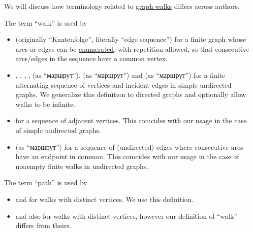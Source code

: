 \begin{remark}\label{rem:graph_walk_terminology}
  We will discuss how terminology related to \hyperref[def:graph_walk]{graph walks} differs across authors.

  \begin{thmenum}
     The term \enquote{walk} is used by
    \begin{itemize}
      \item {} (originally \enquote{Kantenfolge}, literally \enquote{edge sequence}) for a finite graph whose arcs or edges can be \hyperref[def:enumeration]{enumerated}, with repetition allowed, so that consecutive arcs/edges in the sequence have a common vertex.

      \item {}, , , ,  (as \enquote{маршрут}),  (as \enquote{маршрут}) and  (as \enquote{маршрут}) for a finite alternating sequence of vertices and incident edges in simple undirected graphs. We generalize this definition to directed graphs and optionally allow walks to be infinite.

      \item {} for a sequence of adjacent vertices. This coincides with our usage in the case of simple undirected graphs.

      \item {} (as \enquote{маршрут}) for a sequence of (undirected) edges where consecutive arcs have an endpoint in common. This coincides with our usage in the case of nonempty finite walks in undirected graphs.
    \end{itemize}

     The term \enquote{path} is used by
    \begin{itemize}
      \item {} and  for walks with distinct vertices. We use this definition.

      \item {} and  also for walks with distinct vertices, however our definition of \enquote{walk} differs from theirs.


\end{itemize}
\end{thmenum}
\end{remark}
